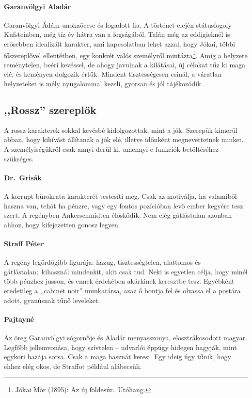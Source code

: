 \documentclass{thesis-ekf}
\theoremstyle{definition}
\begin{document}
    \paragraph{Garanvölgyi Aladár}
    Garanvölgyi Ádám unokaöccse és fogadott fia.
    A történet elején státusfogoly Kufsteinben, még tíz év hátra van a fogságából.
    Talán még az eddigieknél is erősebben idealizált karakter, ami kapcsolatban lehet azzal, hogy Jókai,
        többi főszereplővel ellentétben, egy konkrét valós személyről mintázta\footnote{
        Jókai Mór (1895): Az új földesúr.~Utóhang.
    }.
    Amíg a helyzete reménytelen, beéri kevéssel, de ahogy javulnak a kilátásai, új célokat tűz ki maga elé,
        és keményen dolgozik értük.
    Mindent tisztességesen csinál, a váratlan helyzeteket is mély nyugalommal kezeli, gyorsan és jól tájékozódik.

    \subsection{,,Rossz'' szereplők}
    A rossz karakterek sokkal kevésbé kidolgozottak, mint a jók.
    Szerepük kimerül abban, hogy kihívást állítanak a jók elé, illetve időnként megnevettetnek minket.
    A személyiségükről csak annyi derül ki, amennyi e funkciók betöltéséhez szükséges.

    \paragraph{Dr.~Grisák}
    A korrupt bürokrata karakterét testesíti meg.
    Csak az motiválja, ha valamiből haszna van, tehát ha pénzre, vagy egy fontos pozícióban levő ember kegyére tesz szert.
    A regényben Ankerschmidten élősködik.
    Nem elég gátlástalan azonban ahhoz, hogy kifejezetten gonosz legyen.

    \paragraph{Straff Péter}
    A regény legördögibb figurája: hazug, tisztességtelen, alattomos és gátlástalan;~kihasznál mindenkit, akit csak tud.
    Neki is egyetlen célja, hogy minél több pénzhez jusson, és ennek érdekében akárkinek keresztbe tesz.
    Egyébként eredetileg a ,,cabinet noir'' munkatársa, azaz ő bontja fel és olvassa el a postára adott, gyanúsnak tűnő leveleket.

    \paragraph{Pajtayné}
    Az öreg Garanvölgyi sógornője és Aladár menyasszonya, elosztrákosodott magyar.
    Legfőbb jellemvonása, hogy szívtelen – udvarlói éppúgy hidegen hagyják, mint egykori hazája sorsa.
    Csak a maga hasznát keresi.
    Egy ideig úgy tűnik, hogy ehhez elég okos, de Straffot például alábecsüli.
\end{document}
